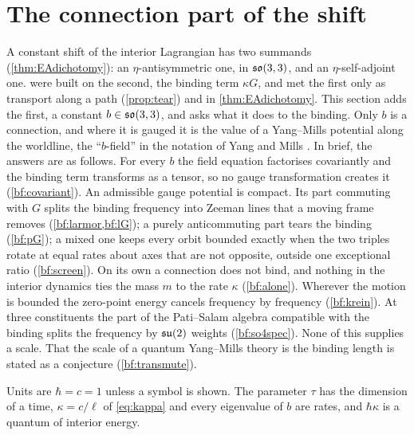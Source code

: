 \section{The connection part of the shift}
\label{sec:bfield}

A constant shift of the interior Lagrangian has two summands (\cref{thm:EAdichotomy}): an $\eta$-antisymmetric one, in $\mathfrak{so}(3,3)$, and an
$\eta$-self-adjoint one.  were built on the second, the binding term $\kappa G$, and met the first only as transport along a path (\cref{prop:tear}) and in \cref{thm:EAdichotomy}. This section adds the
first, a constant $b\in\mathfrak{so}(3,3)$, and asks what it does to the binding. Only $b$ is a connection, and where it is gauged it is the value of a
Yang--Mills potential along the worldline, the ``$b$-field'' in the notation of Yang and Mills \cite{YangMills54}. In brief, the answers are as follows. For
every $b$ the field equation factorises covariantly and the binding term transforms as a tensor, so no gauge transformation creates it
(\cref{bf:covariant}). An admissible gauge potential is compact. Its part commuting with $G$ splits the binding frequency into Zeeman lines that a
moving frame removes (\cref{bf:larmor,bf:lG}); a purely anticommuting part tears the binding (\cref{bf:pG}); a mixed one keeps every orbit bounded
exactly when the two triples rotate at equal rates about axes that are not opposite, outside one exceptional ratio (\cref{bf:screen}). On its own
a connection does not bind, and nothing in the interior dynamics ties the mass $m$ to the rate $\kappa$ (\cref{bf:alone}). Wherever the motion is
bounded the zero-point energy cancels frequency by frequency (\cref{bf:krein}). At three constituents the part of the Pati--Salam algebra
compatible with the binding splits the frequency by $\mathfrak{su}(2)$ weights (\cref{bf:so4spec}). None of this supplies a scale. That the scale of a quantum
Yang--Mills theory is the binding length is stated as a conjecture (\cref{bf:transmute}).

Units are $\hbar=c=1$ unless a symbol is shown. The parameter $\tau$ has the dimension of a time, $\kappa=c/\ell$ of \eqref{eq:kappa} and every
eigenvalue of $b$ are rates, and $\hbar\kappa$ is a quantum of interior energy.

